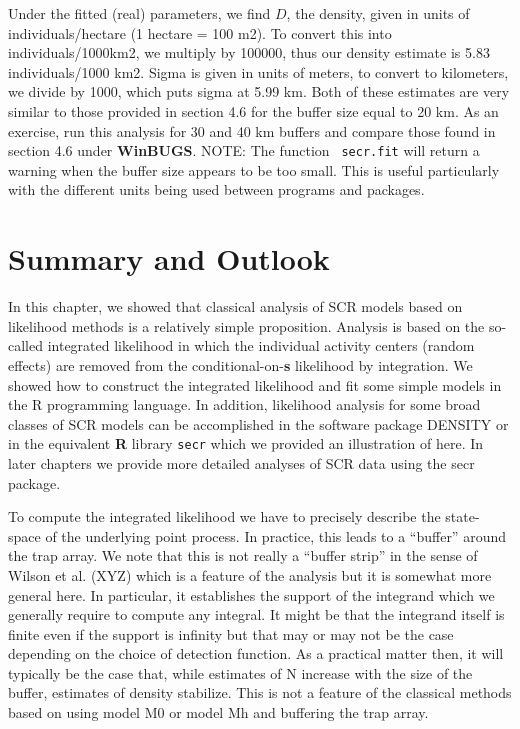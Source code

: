 Under the fitted (real) parameters, we find $D$, the density, given in
units of individuals/hectare (1 hectare = 100 m2).  To convert this
into individuals/1000km2, we multiply by 100000, thus our density
estimate is 5.83 individuals/1000 km2.  Sigma is given in units of
meters, to convert to kilometers, we divide by 1000, which puts sigma
at 5.99 km.  Both of these estimates are very similar to those
provided in section 4.6 for the buffer size equal to 20 km.  As an
exercise, run this analysis for 30 and 40 km buffers and compare those
found in section 4.6 under {\bf WinBUGS}.  NOTE: The function \mbox{\tt
  secr.fit} 
will return a
warning when the buffer size appears to be too small.  This is useful
particularly with the different units being used between programs and
packages.


\section{Summary and Outlook}

In this chapter, we showed that classical analysis of SCR models based
on likelihood methods is a relatively simple proposition.  Analysis is
based on the so-called integrated likelihood in which the individual
activity centers (random effects) are removed from the
conditional-on-{\bf s} likelihood by integration. We showed how to construct
the integrated likelihood and fit some simple models in the R
programming language.  In addition, likelihood analysis for some broad
classes of SCR models can be accomplished in the software package
DENSITY 
or in the equivalent {\bf R}
library \mbox{\tt secr} which we provided an illustration of here. In later
chapters we provide more detailed analyses of SCR data using the secr
package.

To compute the integrated likelihood we have to precisely describe the
state-space of the underlying point process. In practice, this leads
to a “buffer” around the trap array. We note that this is not really a
“buffer strip” in the sense of Wilson et al. (XYZ) which is a feature
of the analysis but it is somewhat more general here. In particular,
it establishes the support of the integrand which we generally require
to compute any integral. It might be that the integrand itself is
finite even if the support is infinity but that may or may not be the
case depending on the choice of detection function. As a practical
matter then, it will typically be the case that, while estimates of N
increase with the size of the buffer, estimates of density
stabilize. This is not a feature of the classical methods based on
using model M0 or model Mh and buffering the trap array.

